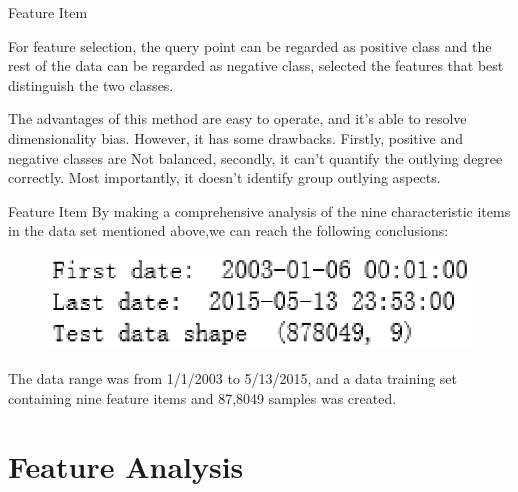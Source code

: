 \documentclass[
 size=14pt,
 paper=smartboard,  %
 mode=present, 		%
 display=slides, 	%
 style=tuliplab,  	%
 pauseslide,
 fleqn,leqno]{powerdot}
\begin{document}
\begin{slide}{Feature Item}
\begin{note}
For feature selection,
the query point can be regarded as positive class and
the rest of the data can be regarded as negative class,
selected the features that best distinguish the two classes.

The advantages of this method are easy to operate,
and it's able to resolve dimensionality bias.
However, it has some drawbacks.
Firstly,
positive and negative classes are Not balanced,
secondly,
it can't quantify the outlying degree correctly.
Most importantly,
it doesn't identify group outlying aspects.
\end{note}

\end{slide}

\begin{slide}{Feature Item}
By making a comprehensive analysis of the nine
characteristic items in the data set mentioned 
above,we can reach the following conclusions:


\bigskip

\begin{figure}[htbp]
  \centering
  \includegraphics[width=1\textwidth]{kaggle/1.eps}
  \caption{}
\end{figure}
\setlength{\parindent}{2em}The data range was from 1/1/2003 to 5/13/2015, and 
a data training set containing nine feature items and 87,8049 
samples was created.
\end{slide}



\section{Feature Analysis}

\end{document}
